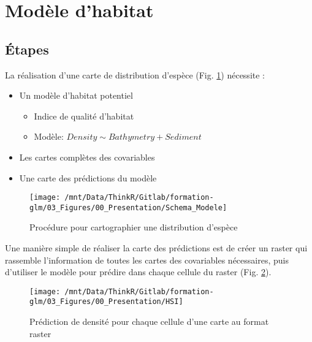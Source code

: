 \documentclass[french,a4paper]{article}
\providecommand{\tightlist}{%
  \setlength{\itemsep}{0pt}\setlength{\parskip}{0pt}}
\begin{document}
\hypertarget{modele-dhabitat}{%
\section{Modèle d'habitat}\label{modele-dhabitat}}

\hypertarget{etapes-3}{%
\subsection{Étapes}\label{etapes-3}}

La réalisation d'une carte de distribution d'espèce (Fig. \ref{fig:figProcedureHSI}) nécessite :

\begin{itemize}
\tightlist
\item
  Un modèle d'habitat potentiel

  \begin{itemize}
  \tightlist
  \item
    Indice de qualité d'habitat
  \item
    Modèle: \(Density \sim Bathymetry + Sediment\)
  \end{itemize}
\item
  Les cartes complètes des covariables
\item
  Une carte des prédictions du modèle
\end{itemize}



\begin{figure}[!h]

{\centering \texttt{[image: /mnt/Data/ThinkR/Gitlab/formation-glm/03\_Figures/00\_Presentation/Schema\_Modele]} 

}

\caption{Procédure pour cartographier une distribution d'espèce}\label{fig:figProcedureHSI}
\end{figure}

Une manière simple de réaliser la carte des prédictions est de créer un raster qui rassemble l'information de toutes les cartes des covariables nécessaires, puis d'utiliser le modèle pour prédire dans chaque cellule du raster (Fig. \ref{fig:figRasterHSI}).



\begin{figure}[!h]

{\centering \texttt{[image: /mnt/Data/ThinkR/Gitlab/formation-glm/03\_Figures/00\_Presentation/HSI]} 

}

\caption{Prédiction de densité pour chaque cellule d'une carte au format raster}\label{fig:figRasterHSI}
\end{figure}
\end{document}
